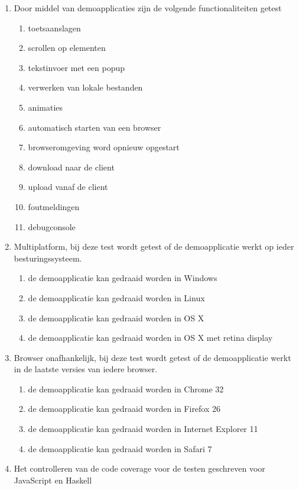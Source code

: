 \begin{enumerate}[label={T\arabic*}]
	\setcounter{enumi}{\value{startvaluetest}}
	\item \label{test:blackbox:demo} Door middel van demoapplicaties zijn de volgende functionaliteiten getest
    \begin{enumerate}[label={T\arabic{enumi}.\arabic*}]
		\item \label{test:blackbox:keyevents} toetsaanslagen
		\item \label{test:blackbox:scrollevents} scrollen op elementen
		\item \label{test:blackbox:prompt} tekstinvoer met een popup
		\item \label{test:blackbox:lokalebestanden} verwerken van lokale bestanden
		\item \label{test:blackbox:animatie} animaties
		\item \label{test:blackbox:browser} automatisch starten van een browser
		\item \label{test:blackbox:automatischherstartenserver} browseromgeving word opnieuw opgestart
		\item \label{test:blackbox:download} download naar de client
		\item \label{test:blackbox:upload} upload vanaf de client
		\item \label{test:blackbox:error} foutmeldingen
		\item \label{test:blackbox:debug} debugconsole
	\end{enumerate}
	\item \label{test:blackbox:multiplatform} Multiplatform, bij deze test wordt getest of de demoapplicatie werkt op ieder besturingssysteem.
    \begin{enumerate}[label={T\arabic{enumi}.\arabic*}]
    	\item de demoapplicatie kan gedraaid worden in Windows
    	\item de demoapplicatie kan gedraaid worden in Linux
    	\item de demoapplicatie kan gedraaid worden in OS X
    	\item de demoapplicatie kan gedraaid worden in OS X met retina display
    \end{enumerate}
	\item \label{test:blackbox:browser} Browser onafhankelijk, bij deze test wordt getest of de demoapplicatie werkt in de laatste versies van iedere browser.
    \begin{enumerate}[label={T\arabic{enumi}.\arabic*}]
    	\item de demoapplicatie kan gedraaid worden in Chrome 32
    	\item de demoapplicatie kan gedraaid worden in Firefox 26
    	\item de demoapplicatie kan gedraaid worden in Internet Explorer 11
    	\item de demoapplicatie kan gedraaid worden in Safari 7
    \end{enumerate}
	\item \label{test:blackbox:coverage} Het controlleren van de code coverage voor de testen geschreven voor JavaScript en Haskell
\end{enumerate}

